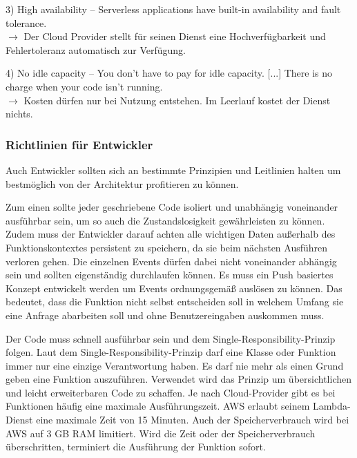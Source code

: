 3) \glqq High availability – Serverless applications have built-in availability and fault tolerance.\grqq
\\ $\rightarrow$ Der Cloud Provider stellt für seinen Dienst eine Hochverfügbarkeit und Fehlertoleranz automatisch zur Verfügung.

4) \glqq No idle capacity – You don't have to pay for idle capacity.\grqq{} [...] \glqq There is no charge when your code isn’t running. \grqq
\\ $\rightarrow$ Kosten dürfen nur bei Nutzung entstehen. Im Leerlauf kostet der Dienst nichts.


\subsubsection{Richtlinien für Entwickler }

Auch Entwickler sollten sich an bestimmte Prinzipien und Leitlinien halten um bestmöglich von der Architektur profitieren zu können.

Zum einen sollte jeder geschriebene Code isoliert und unabhängig voneinander ausführbar sein, um so auch die Zustandslosigkeit gewährleisten zu können.
Zudem muss der Entwickler darauf achten alle wichtigen Daten außerhalb des Funktionskontextes persistent zu speichern, da sie beim nächsten Ausführen verloren gehen.
Die einzelnen Events dürfen dabei nicht voneinander abhängig sein und sollten eigenständig durchlaufen können.
Es muss ein Push basiertes Konzept entwickelt werden um Events ordnungsgemäß auslösen zu können.
Das bedeutet, dass die Funktion nicht selbst entscheiden soll in welchem Umfang sie eine Anfrage abarbeiten soll und ohne Benutzereingaben auskommen muss.

Der Code muss schnell ausführbar sein und dem Single-Responsibility-Prinzip folgen.
Laut dem Single-Responsibility-Prinzip darf eine Klasse oder Funktion immer nur eine einzige Verantwortung haben.
Es darf nie mehr als einen Grund geben eine Funktion auszuführen.
Verwendet wird das Prinzip um übersichtlichen und leicht erweiterbaren Code zu schaffen.
Je nach Cloud-Provider gibt es bei Funktionen häufig eine maximale Ausführungszeit.
AWS erlaubt seinem Lambda-Dienst eine maximale Zeit von 15 Minuten.
Auch der Speicherverbrauch wird bei AWS auf 3 GB RAM limitiert.
Wird die Zeit oder der Speicherverbrauch überschritten, terminiert die Ausführung der Funktion sofort.\cite[]{LambdaPreise}



